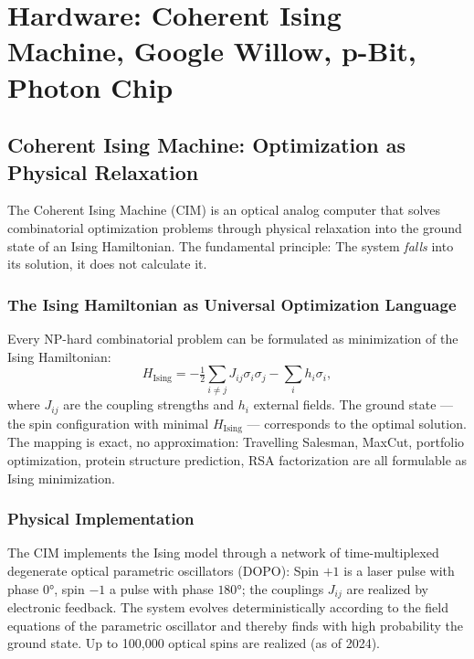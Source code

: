\chapter{Hardware: Coherent Ising Machine, Google Willow, p-Bit, Photon Chip}
\label{ch:hardware}

\section{Coherent Ising Machine: Optimization as Physical Relaxation}

The Coherent Ising Machine (CIM) is an optical analog computer that
solves combinatorial optimization problems through physical relaxation
into the ground state of an Ising Hamiltonian. The fundamental principle:
The system \emph{falls} into its solution, it does not calculate it.

\subsection*{The Ising Hamiltonian as Universal Optimization Language}

Every NP-hard combinatorial problem can be formulated as minimization of the
Ising Hamiltonian:
\begin{equation}
  H_{\mathrm{Ising}} = -\tfrac12\sum_{i\ne j}J_{ij}\sigma_i\sigma_j
  - \sum_i h_i\sigma_i,
\end{equation}
where $J_{ij}$ are the coupling strengths and $h_i$ external fields.
The ground state --- the spin configuration with minimal $H_{\mathrm{Ising}}$
--- corresponds to the optimal solution. The mapping is exact, no
approximation: Travelling Salesman, MaxCut, portfolio optimization,
protein structure prediction, RSA factorization are all formulable as
Ising minimization.

\subsection*{Physical Implementation}

The CIM implements the Ising model through a network of time-multiplexed
degenerate optical parametric oscillators (DOPO):
Spin $+1$ is a laser pulse with phase $0°$, spin $-1$ a pulse with
phase $180°$; the couplings $J_{ij}$ are realized by electronic
feedback. The system evolves deterministically according to
the field equations of the parametric oscillator and thereby finds with
high probability the ground state. Up to 100,000 optical
spins are realized (as of 2024).


